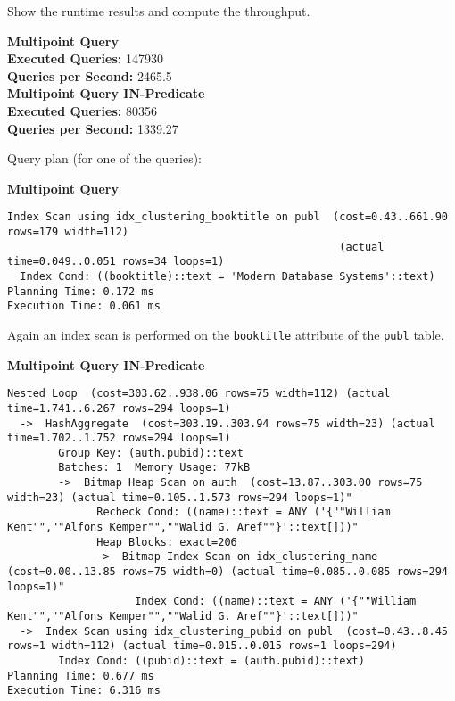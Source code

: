 \documentclass[11pt]{scrartcl}
\begin{document}
Show the runtime results and compute the throughput.

\textbf{Multipoint Query}\\
\textbf{Executed Queries: } 147930\\
\textbf{Queries per Second: } 2465.5\\

\textbf{Multipoint Query IN-Predicate}\\
\textbf{Executed Queries: } 80356\\
\textbf{Queries per Second: } 1339.27

Query plan (for one of the queries):

\textbf{Multipoint Query}
{\small
\parskip0pt\begin{verbatim}
Index Scan using idx_clustering_booktitle on publ  (cost=0.43..661.90 rows=179 width=112)
                                                    (actual time=0.049..0.051 rows=34 loops=1)
  Index Cond: ((booktitle)::text = 'Modern Database Systems'::text)
Planning Time: 0.172 ms
Execution Time: 0.061 ms

\end{verbatim}}

Again an index scan is performed on the \texttt{booktitle} attribute of the \texttt{publ} table.

\textbf{Multipoint Query IN-Predicate}
{\small
\parskip0pt\begin{verbatim}
Nested Loop  (cost=303.62..938.06 rows=75 width=112) (actual time=1.741..6.267 rows=294 loops=1)
  ->  HashAggregate  (cost=303.19..303.94 rows=75 width=23) (actual time=1.702..1.752 rows=294 loops=1)
        Group Key: (auth.pubid)::text
        Batches: 1  Memory Usage: 77kB
        ->  Bitmap Heap Scan on auth  (cost=13.87..303.00 rows=75 width=23) (actual time=0.105..1.573 rows=294 loops=1)"
              Recheck Cond: ((name)::text = ANY ('{""William Kent"",""Alfons Kemper"",""Walid G. Aref""}'::text[]))"
              Heap Blocks: exact=206
              ->  Bitmap Index Scan on idx_clustering_name  (cost=0.00..13.85 rows=75 width=0) (actual time=0.085..0.085 rows=294 loops=1)"
                    Index Cond: ((name)::text = ANY ('{""William Kent"",""Alfons Kemper"",""Walid G. Aref""}'::text[]))"
  ->  Index Scan using idx_clustering_pubid on publ  (cost=0.43..8.45 rows=1 width=112) (actual time=0.015..0.015 rows=1 loops=294)
        Index Cond: ((pubid)::text = (auth.pubid)::text)
Planning Time: 0.677 ms
Execution Time: 6.316 ms
\end{verbatim}}
\end{document}
